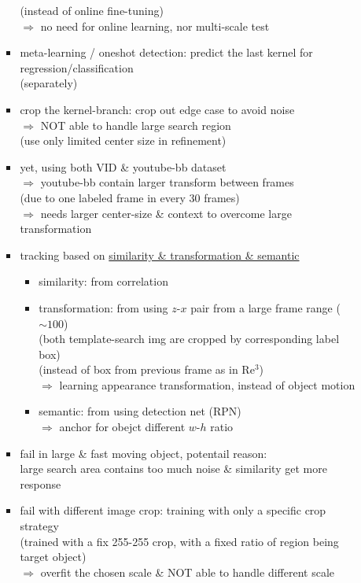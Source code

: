 \begin{itemize}
\begin{itemize}
\begin{itemize}
		(instead of online fine-tuning) \\ 
		$\Rightarrow$ no need for online learning, nor multi-scale test
		\item meta-learning / oneshot detection: predict the last kernel for regression/classification \\
		(separately)
		\item crop the kernel-branch: crop out edge case to avoid noise \\
		$\Rightarrow$ NOT able to handle large search region \\ 
		(use only limited center size in refinement)
		\item yet, using both VID \& youtube-bb dataset \\
		$\Rightarrow$ youtube-bb contain larger transform between frames \\
		(due to one labeled frame in every 30 frames) \\
		$\Rightarrow$ needs larger center-size \& context to overcome large transformation
		\item tracking based on \underline{similarity \& transformation \& semantic}
			\begin{itemize}
			\item similarity: from correlation
			\item transformation: from using $z$-$x$ pair from a large frame range ($\sim100$) \\
			(both template-search img are cropped by corresponding label box) \\
			(instead of box from previous frame as in Re$^3$) \\
			$\Rightarrow$ learning appearance transformation, instead of object motion
			\item semantic: from using detection net (RPN) \\
			$\Rightarrow$ anchor for obejct different $w$-$h$ ratio
			\end{itemize}
		\item fail in large \& fast moving object, potentail reason: \\
		large search area contains too much noise \& similarity get more response
		\item fail with different image crop: training with only a specific crop strategy \\
		(trained with a fix 255-255 crop, with a fixed ratio of region being target object) \\
		$\Rightarrow$ overfit the chosen scale \& NOT able to handle different scale \\

\end{itemize}
\end{itemize}
\end{itemize}
